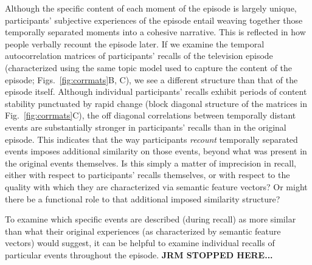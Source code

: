\documentclass{article}
\begin{document}
Although the specific content of each moment of the episode is largely unique, participants' subjective experiences of the episode entail weaving together those temporally separated moments into a cohesive narrative.  This is reflected in how people verbally recount the episode later.  If we examine the temporal autocorrelation matrices of participants' recalls of the television episode (characterized using the same topic model used to capture the content of the episode; Figs.~\ref{fig:corrmats}B, C), we see a different structure than that of the episode itself.  Although individual participants' recalls exhibit periods of content stability punctuated by rapid change (block diagonal structure of the matrices in Fig.~\ref{fig:corrmats}C), the off diagonal correlations between temporally distant events are substantially stronger in participants' recalls than in the original episode.  This indicates that the way participants \textit{recount} temporally separated events imposes additional similarity on those events, beyond what was present in the original events themselves.  Is this simply a matter of imprecision in recall, either with respect to participants' recalls themselves, or with respect to the quality with which they are characterized via semantic feature vectors?  Or might there be a functional role to that additional imposed similarity structure?

To examine which specific events are described (during recall) as more similar than what their original experiences (as characterized by semantic feature vectors) would suggest, it can be helpful to examine individual recalls of particular events throughout the episode.  \textbf{JRM STOPPED HERE...}


\end{document}
